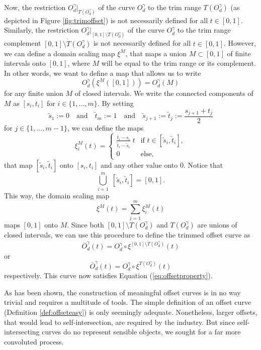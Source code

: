 \documentclass[a4paper, 11pt]{report}
\theoremstyle{definition}
\newcommand{\domrestr}{\big|}
\begin{document}
	Now, the restriction $O^{\gamma}_d \domrestr_{T(O^\gamma_d)}$ of the curve $O^{\gamma}_d$ to the trim range $T(O^\gamma_d)$ (as depicted in Figure \ref{fig:trimoffset}) is not necessarily defined for all $t \in [0,1]$. Similarly, the restriction $O^{\gamma}_d \domrestr_{\overline{[0,1] \setminus T(O^\gamma_d)}}$ of the curve $O^{\gamma}_d$ to the trim range complement $\overline{[0,1] \setminus T(O^\gamma_d)}$ is not necessarily defined for all $t \in [0,1]$. However, we can define a domain scaling map $\xi^M$, that maps a union $M \subset [0,1]$ of finite intervals onto $[0,1]$, where $M$ will be equal to the trim range or its complement. In other words, we want to define a map that allows us to write
		$$O^{\gamma}_d(\xi^M([0,1])) = O^{\gamma}_d (M)$$
	for any finite union $M$ of closed intervals.
	We write the connected components of $M$ as $[s_i, t_i]$ for $i \in \{1,...,m\}$. By setting
		$$ \tilde s_1 := 0 \quad\text{and}\quad \tilde t_m := 1 \quad\text{and}\quad \tilde s_{j+1} := \tilde t_j := \frac{s_{j+1} + t_j}{2} $$
	for $j \in \{1,...,m-1\}$, we can define the maps
		$$ \xi^M_i(t) = 
				\begin{cases}
					\frac{t_i - s_i}{\tilde t_i - \tilde s_i} \; t 	&\text{if } t \in [\tilde s_i, \tilde t_i], \\
					0 												&\text{else},
				\end{cases}
		$$
	that map $[\tilde s_i, \tilde t_i]$ onto $[s_i, t_i]$ and any other value onto $0$. Notice that
		$$ \bigcup_{i=1}^m \; [\tilde s_i, \tilde t_i] = [0,1].$$
	This way, the domain scaling map
		$$ \xi^M(t) = \sum_{i=1}^m \xi^M_i(t) $$
	maps $[0,1]$ onto $M$. Since both $\overline{[0,1] \setminus T(O^\gamma_d)}$ and $T(O^\gamma_d)$ are unions of closed intervals, we can use this procedure to define the trimmed offset curve as
		$$ \overline{O}^\gamma_d (t) = O^\gamma_d \circ \xi^{\overline{[0,1] \setminus T(O^\gamma_d)}}(t)$$
	or 
		$$ \overline{O}^\gamma_d (t) = O^\gamma_d \circ \xi^{T(O^\gamma_d)}(t)$$
	respectively. This curve now satisfies Equation (\ref{eq:offsetproperty}).

	As has been shown, the construction of meaningful offset curves is in no way trivial and requires a multitude of tools. The simple definition of an offset curve (Definition \ref{def:offseteasy}) is only seemingly adequate. Nonetheless, larger offsets, that would lead to self-intersection, are required by the industry. But since self-intersecting curves do no represent sensible objects, we sought for a far more convoluted process.
\end{document}
